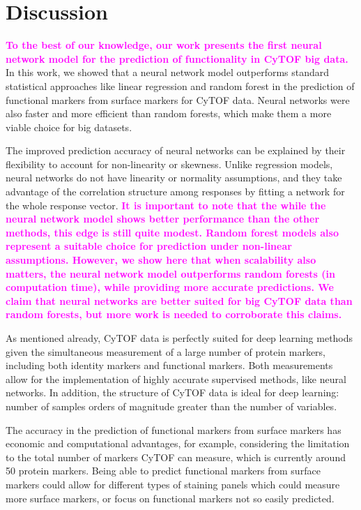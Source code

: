 \documentclass[graybox]{svmult}
\newcommand{\claudia}[2]{\sout{#1}\textcolor{magenta}{\textbf{#2}}}
\begin{document}
\section{Discussion}

\claudia{}{To the best of our knowledge, our work presents the first
  neural network model for the prediction of functionality in CyTOF
  big data.}  In this work, we showed that a neural network model
outperforms standard statistical approaches like linear regression and
random forest in the prediction of functional markers from surface
markers for CyTOF data. Neural networks were also faster and more
efficient than random forests, which make them a more viable choice
for big datasets.

The improved prediction accuracy of neural networks can be explained
by their flexibility to account for non-linearity or skewness.  Unlike
regression models, neural networks do not have linearity or normality
assumptions, and they take advantage of the correlation structure
among responses by fitting a network for the whole response vector.
\claudia{}{It is important to note that the while the neural network
  model shows better performance than the other methods, this edge is
  still quite modest. Random forest models also represent a suitable
  choice for prediction under non-linear assumptions. However, we show
  here that when scalability also matters, the neural network model
  outperforms random forests (in computation time), while providing
  more accurate predictions. We claim that neural networks are better
  suited for big CyTOF data than random forests, but more work is
  needed to corroborate this claims.}

As mentioned already, CyTOF data is perfectly suited for deep learning
methods given the simultaneous measurement of a large number of
protein markers, including both identity markers and functional
markers. Both measurements allow for the implementation of highly
accurate supervised methods, like neural networks. In addition, the
structure of CyTOF data is ideal for deep learning: number of samples
orders of magnitude greater than the number of variables.

The accuracy in the prediction of functional markers from surface
markers has economic and computational advantages, for example,
considering the limitation to the total number of markers CyTOF can
measure, which is currently around 50 protein markers. Being able to
predict functional markers from surface markers could allow for
different types of staining panels which could measure more surface
markers, or focus on functional markers not so easily predicted.
\end{document}
